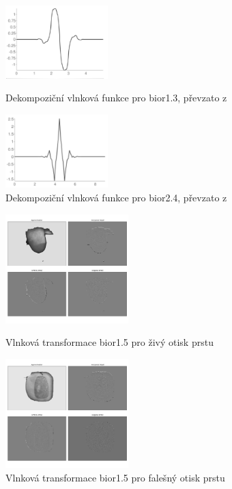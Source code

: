 \begin{figure}[!htbp]
  \begin{minipage}[b]{0.5\linewidth}
    \centering
    \includegraphics[width=150px]{obrazky-figures/bior13wavelet.PNG}
    \caption{Dekompoziční vlnková funkce pro bior1.3, převzato z \cite{PyWaveletsBrowser}}
  \end{minipage}
  \hspace{0.5cm}
  \begin{minipage}[b]{0.5\linewidth}
    \centering
    \includegraphics[width=150px]{obrazky-figures/bior24wavelet.PNG}
    \caption{Dekompoziční vlnková funkce pro bior2.4, převzato z \cite{PyWaveletsBrowser}}
  \end{minipage}
\end{figure}

\begin{figure}[!htbp]
  \begin{minipage}[b]{0.5\linewidth}
    \centering
    \includegraphics[width=180px]{obrazky-figures/Images14bior15mean.png}
    \caption{Vlnková transformace bior1.5 pro živý otisk prstu}
  \end{minipage}
  \hspace{0.5cm}
  \begin{minipage}[b]{0.5\linewidth}
    \centering
    \includegraphics[width=180px]{obrazky-figures/fake21otsubior15.png}
    \caption{Vlnková transformace bior1.5 pro falešný otisk prstu}
  \end{minipage}
\end{figure}



